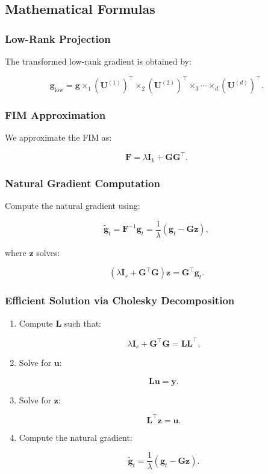 \subsection{Mathematical Formulas}

\subsubsection{Low-Rank Projection}

The transformed low-rank gradient is obtained by:

\[
\boldsymbol{g}_{\text{low}} = \boldsymbol{g} \times_1 (\mathbf{U}^{(1)})^\top \times_2 (\mathbf{U}^{(2)})^\top \times_3 \cdots \times_d (\mathbf{U}^{(d)})^\top.
\]

\subsubsection{FIM Approximation}

We approximate the FIM as:

\[
\mathbf{F} = \lambda \mathbf{I}_k + \mathbf{G} \mathbf{G}^\top.
\]

\subsubsection{Natural Gradient Computation}

Compute the natural gradient using:

\[
\tilde{\boldsymbol{g}}_t = \mathbf{F}^{-1} \boldsymbol{g}_t = \dfrac{1}{\lambda} \left( \boldsymbol{g}_t - \mathbf{G} \boldsymbol{z} \right),
\]

where $\boldsymbol{z}$ solves:

\[
\left( \lambda \mathbf{I}_s + \mathbf{G}^\top \mathbf{G} \right) \boldsymbol{z} = \mathbf{G}^\top \boldsymbol{g}_t.
\]

\subsubsection{Efficient Solution via Cholesky Decomposition}

\begin{enumerate}
    \item Compute $\mathbf{L}$ such that:

    \[
    \lambda \mathbf{I}_s + \mathbf{G}^\top \mathbf{G} = \mathbf{L} \mathbf{L}^\top.
    \]

    \item Solve for $\boldsymbol{u}$:

    \[
    \mathbf{L} \boldsymbol{u} = \boldsymbol{y}.
    \]

    \item Solve for $\boldsymbol{z}$:

    \[
    \mathbf{L}^\top \boldsymbol{z} = \boldsymbol{u}.
    \]

    \item Compute the natural gradient:

    \[
    \tilde{\boldsymbol{g}}_t = \dfrac{1}{\lambda} \left( \boldsymbol{g}_t - \mathbf{G} \boldsymbol{z} \right).
    \]
\end{enumerate}

